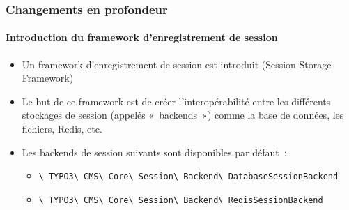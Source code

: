 
\begin{frame}[fragile]
	\frametitle{Changements en profondeur}
	\framesubtitle{Introduction du framework d'enregistrement de session}

	\begin{itemize}
		\item Un framework d'enregistrement de session est introduit (Session Storage Framework)
		\item Le but de ce framework est de créer l'interopérabilité entre les
			différents stockages de session (appelés «~backends~») comme la base
			de données, les fichiers, Redis, etc.
		\item Les backends de session suivants sont disponibles par défaut~:

			\begin{itemize}
				\item
					\smaller\texttt{\textbackslash
						TYPO3\textbackslash
						CMS\textbackslash
						Core\textbackslash
						Session\textbackslash
						Backend\textbackslash
						DatabaseSessionBackend}

				\item
					\texttt{\textbackslash
						TYPO3\textbackslash
						CMS\textbackslash
						Core\textbackslash
						Session\textbackslash
						Backend\textbackslash
						RedisSessionBackend}
			\end{itemize}
	\end{itemize}

\end{frame}


